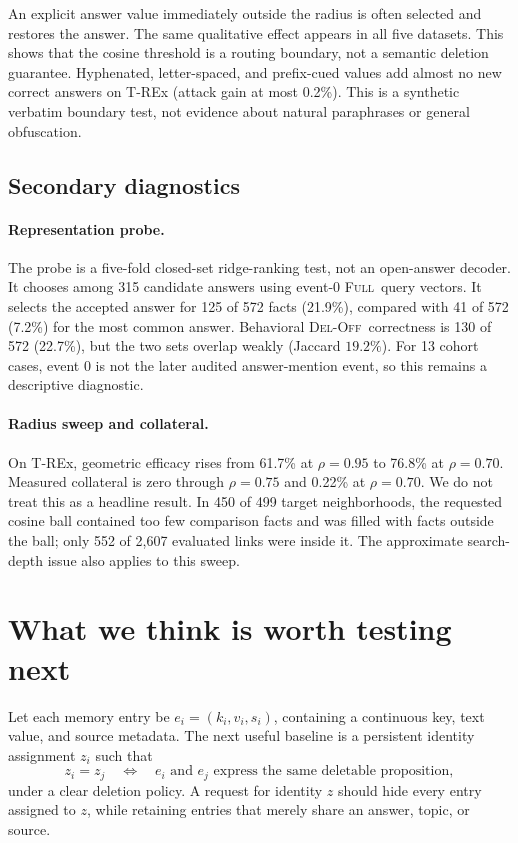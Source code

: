 \documentclass[11pt]{article}
\newcommand{\FULL}{\textsc{Full}}
\newcommand{\DELOFF}{\textsc{Del-Off}}
\newcommand{\pct}[1]{#1\%}
\begin{document}
An explicit answer value immediately outside the radius is often selected and
restores the answer. The same qualitative effect appears in all five
datasets. This shows that the cosine threshold is a routing boundary, not a
semantic deletion guarantee. Hyphenated, letter-spaced, and prefix-cued
values add almost no new correct answers on T-REx (attack gain at most
\pct{0.2}). This is a synthetic verbatim boundary test, not evidence about
natural paraphrases or general obfuscation.

\subsection{Secondary diagnostics}

\paragraph{Representation probe.}
The probe is a five-fold closed-set ridge-ranking test, not an open-answer
decoder. It chooses among 315 candidate answers using event-0 \FULL\ query
vectors. It selects the accepted answer for 125 of 572 facts (\pct{21.9}),
compared with 41 of 572 (\pct{7.2}) for the most common answer. Behavioral
\DELOFF\ correctness is 130 of 572 (\pct{22.7}), but the two sets overlap
weakly (Jaccard \(\pct{19.2}\)). For 13 cohort cases, event 0 is not the later
audited answer-mention event, so this remains a descriptive diagnostic.

\paragraph{Radius sweep and collateral.}
On T-REx, geometric efficacy rises from \pct{61.7} at \(\rho=0.95\) to
\pct{76.8} at \(\rho=0.70\). Measured collateral is zero through
\(\rho=0.75\) and \pct{0.22} at \(\rho=0.70\). We do not treat this as a
headline result. In 450 of 499 target neighborhoods, the requested cosine
ball contained too few comparison facts and was filled with facts outside
the ball; only 552 of 2,607 evaluated links were inside it. The approximate
search-depth issue also applies to this sweep.

\section{What we think is worth testing next}

Let each memory entry be \(e_i=(k_i,v_i,s_i)\), containing a continuous key,
text value, and source metadata. The next useful baseline is a persistent
identity assignment \(z_i\) such that
\[
z_i=z_j
\quad\Longleftrightarrow\quad
e_i \text{ and } e_j \text{ express the same deletable proposition},
\]
under a clear deletion policy. A request for identity \(z\) should hide every
entry assigned to \(z\), while retaining entries that merely share an answer,
topic, or source.
\end{document}
